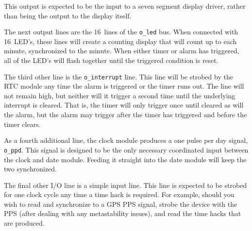 \documentclass{gqtekspec}
\begin{document}
This output is expected to be the input to a seven segment display driver,
rather than being the output to the display itself.

The next output lines are the 16~lines of the {\tt o\_led} bus.  When connected
with 16~LED's, these lines will create a counting display that will count up
to each minute, synchronized to the minute.  When either timer or alarm has
triggered, all of the LED's will flash together until the triggered condition
is reset.

The third other line is the {\tt o\_interrupt} line.  This line will be 
strobed by the RTC module any time the alarm is triggered or the timer runs
out.  The line will not remain high, but neither will it trigger a second
time until the underlying interrupt is cleared.  That is, the timer will only
trigger once until cleared as will the alarm, but the alarm may trigger after
the timer has triggered and before the timer clears.

As a fourth additional line, the clock module produces a one pulse per day
signal, {\tt o\_ppd}.  This signal is designed to be the only necessary
coordinated input between the clock and date module.  Feeding it straight
into the date module will keep the two synchronized.

The final other I/O line is a simple input line.  This line is expected to be
strobed for one clock cycle any time a time hack is required.  For example,
should you wish to read and synchronize to a GPS PPS signal, strobe the device
with the PPS (after dealing with any metastability issues), and read the time
hacks that are produced.
\end{document}
